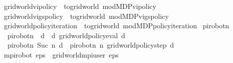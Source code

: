 \begin{isabellebody}
\isamarkupfalse%
\ {\isachardoublequoteopen}gridworld{\isacharunderscore}{\kern0pt}vi{\isacharunderscore}{\kern0pt}policy{\isacharprime}{\kern0pt}\ {\isasymequiv}\ to{\isacharunderscore}{\kern0pt}gridworld{\isacharprime}{\kern0pt}\ mod{\isacharunderscore}{\kern0pt}MDP{\isacharunderscore}{\kern0pt}vi{\isacharunderscore}{\kern0pt}policy{\isacharprime}{\kern0pt}{\isachardoublequoteclose}\isanewline
{}\isamarkupfalse%
\ {\isachardoublequoteopen}gridworld{\isacharunderscore}{\kern0pt}vi{\isacharunderscore}{\kern0pt}gs{\isacharunderscore}{\kern0pt}policy\ {\isasymequiv}\ to{\isacharunderscore}{\kern0pt}gridworld{\isacharprime}{\kern0pt}\ mod{\isacharunderscore}{\kern0pt}MDP{\isacharunderscore}{\kern0pt}vi{\isacharunderscore}{\kern0pt}gs{\isacharunderscore}{\kern0pt}policy{\isachardoublequoteclose}\isanewline
{}\isamarkupfalse%
\ {\isachardoublequoteopen}gridworld{\isacharunderscore}{\kern0pt}policy{\isacharunderscore}{\kern0pt}iteration\ {\isasymequiv}\ to{\isacharunderscore}{\kern0pt}gridworld{\isacharprime}{\kern0pt}\ mod{\isacharunderscore}{\kern0pt}MDP{\isacharunderscore}{\kern0pt}policy{\isacharunderscore}{\kern0pt}iteration{\isachardoublequoteclose}\isanewline
\isanewline
\isanewline
{}\isamarkupfalse%
\ pi{\isacharunderscore}{\kern0pt}robot{\isacharunderscore}{\kern0pt}n\ \isanewline
\ \ {\isachardoublequoteopen}pi{\isacharunderscore}{\kern0pt}robot{\isacharunderscore}{\kern0pt}n\ {}\ d\ {\isacharequal}{\kern0pt}\ {\isacharparenleft}{\kern0pt}d{\isacharcomma}{\kern0pt}\ gridworld{\isacharunderscore}{\kern0pt}policy{\isacharunderscore}{\kern0pt}eval{\isacharprime}{\kern0pt}\ d{\isacharparenright}{\kern0pt}{\isachardoublequoteclose}\ {\isacharbar}{\kern0pt}\ \isanewline
\ \ {\isachardoublequoteopen}pi{\isacharunderscore}{\kern0pt}robot{\isacharunderscore}{\kern0pt}n\ {\isacharparenleft}{\kern0pt}Suc\ n{\isacharparenright}{\kern0pt}\ d\ {\isacharequal}{\kern0pt}\ pi{\isacharunderscore}{\kern0pt}robot{\isacharunderscore}{\kern0pt}n\ n\ {\isacharparenleft}{\kern0pt}gridworld{\isacharunderscore}{\kern0pt}policy{\isacharunderscore}{\kern0pt}step{\isacharprime}{\kern0pt}\ d{\isacharparenright}{\kern0pt}{\isachardoublequoteclose}\isanewline
\isanewline
{}\isamarkupfalse%
\ {\isachardoublequoteopen}mpi{\isacharunderscore}{\kern0pt}robot\ eps\ {\isacharequal}{\kern0pt}\ gridworld{\isacharunderscore}{\kern0pt}mpi{\isacharunderscore}{\kern0pt}user\ eps\ {\isacharparenleft}{\kern0pt}{\isasymlambda}{\isacharunderscore}{\kern0pt}{\isachardot}{\kern0pt}\ {}{\isacharparenright}{\kern0pt}{\isachardoublequoteclose}\isanewline

\end{isabellebody}
